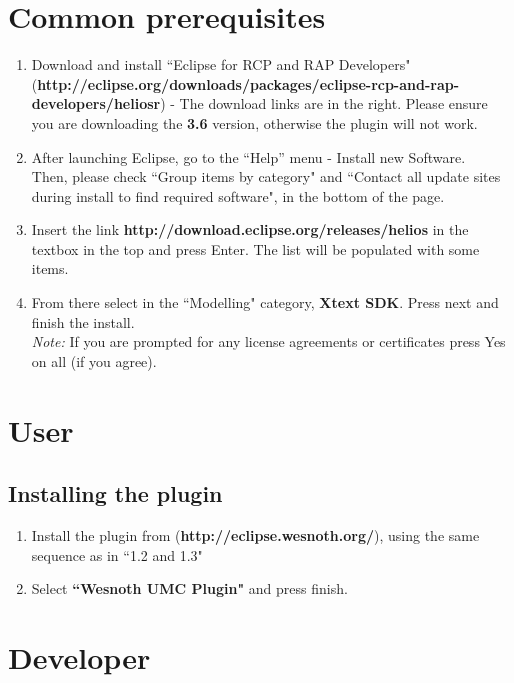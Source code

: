 \documentclass[10pt]{article}
\begin{document}
\section{Common prerequisites}
\begin{enumerate}
\item Download and install ``Eclipse for RCP and RAP Developers" (\textbf{http://eclipse.org/downloads/packages/eclipse-rcp-and-rap-developers/heliosr}) -
The download links are in the right. Please ensure you are downloading the \textbf{3.6} version,
otherwise the plugin will not work.
\item After launching Eclipse, go to the ``Help'' menu - Install new Software. \\
  Then, please check ``Group items by category" and ``Contact all update sites during install to find required software",
  in the bottom of the page.
\item Insert the link \textbf{http://download.eclipse.org/releases/helios} in the textbox in the top and press Enter.
  The list will be populated with some items.
\item From there select in the ``Modelling" category, \textbf{Xtext SDK}.
  Press next and finish the install.\\
  \textit{Note:} If you are prompted for any license agreements or certificates press Yes on all (if you agree).
\end{enumerate}

\section{User}
\subsection{Installing the plugin}
\begin{enumerate}
\item Install the plugin from (\textbf{http://eclipse.wesnoth.org/}), using the same sequence as in ``1.2 and 1.3"
\item Select \textbf{``Wesnoth UMC Plugin"} and press finish.
\end{enumerate}

\section{Developer}
\end{document}
